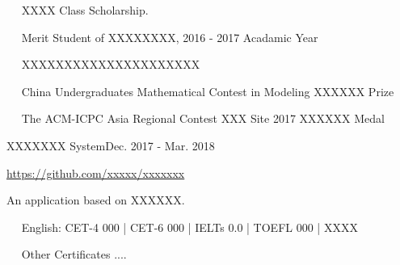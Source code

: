\documentclass{sorahjy_cv}
\begin{document}
%
%

\begin{description}{}
	\item{\ \ } XXXX Class Scholarship.
	\item{\ \ } Merit Student of XXXXXXXX, 2016 - 2017 Acadamic Year
	\item{\ \ } XXXXXXXXXXXXXXXXXXXXX
	\item{\ \ } China Undergraduates Mathematical Contest in Modeling {\color{orangeRed}XXXXXX Prize}
	\item{\ \ } The ACM-ICPC Asia Regional Contest XXX Site 2017 {\color{orangeRed}XXXXXX Medal}
\end{description}


%
%


\begin{sectionContentSimple}{XXXXXXX System}{Dec. 2017 - Mar. 2018}
	\item \url{https://github.com/xxxxx/xxxxxxx}
	\item An application based on XXXXXX.
\end{sectionContentSimple}


%
%



%
%
\begin{description}{}
	\item{\ \ } English: CET-4 000 | CET-6 000 | IELTs 0.0 | TOEFL 000 | XXXX
	\item{\ \ } Other Certificates ....
\end{description}




%
%

\end{document}
